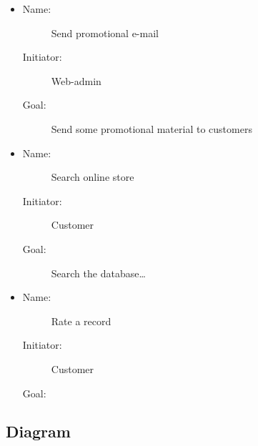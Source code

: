 \documentclass[12pt, titlepage]{article}
\begin{document}
\begin{description}
\begin{itemize}
    \item
        \begin{description}
            \item[Name:]Send promotional e-mail 
            \item[Initiator:]Web-admin 
            \item[Goal:]Send some promotional material to customers 
        \end{description}

    \item 
        \begin{description}
            \item[Name:]Search online store
            \item[Initiator:]Customer
            \item[Goal:]Search the database\dots
        \end{description}
    \item 
        \begin{description}
        \item[Name:]Rate a record 
        \item[Initiator:]Customer 
        \item[Goal:] 
        \end{description}
    \end{itemize}
\end{description}

\subsection{Diagram}
\end{document}
